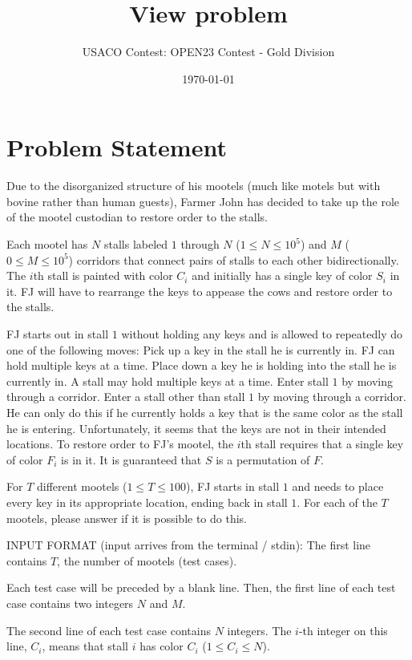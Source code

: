 \documentclass[12pt]{article}
\title{View problem}
\author{USACO Contest: OPEN23 Contest - Gold Division}
\date{\today}
\begin{document}
\maketitle

\section*{Problem Statement}


Due to the disorganized structure of his mootels (much like motels but with
bovine rather than human guests), Farmer John has decided to take up the role of
the mootel custodian to restore order to the stalls.

Each mootel has $N$ stalls labeled $1$ through $N$ ($1 \le N \le 10^5$) and $M$
($0 \le M \le 10^5$) corridors that connect pairs of stalls to each other
bidirectionally. The $i$th stall is painted with color $C_i$ and initially has a
single key of color $S_i$ in it. FJ will have to rearrange the keys to appease
the cows and restore order to the stalls.

FJ starts out in stall $1$ without holding any keys and is allowed to repeatedly
do one of the following moves:
 Pick up a key in the stall he is currently in. FJ can hold multiple keys at
a time. Place down a key he is holding into the stall he is currently
in. A stall may hold multiple keys at a time. Enter stall $1$ by
moving through a corridor. Enter a stall other than stall $1$ by
moving through a corridor. He can only do this if he currently holds a key that
is the same color as the stall he is entering.
Unfortunately, it seems that the keys are not in their intended locations. To
restore order to FJ's mootel, the $i$th stall requires that a single key of
color $F_i$ is in it. It is guaranteed that $S$ is a permutation of $F$.

For $T$ different mootels ($1 \le T \le 100$), FJ starts in stall $1$ and needs
to place every key in its appropriate location, ending back in stall $1$. For
each of the $T$ mootels, please answer if it is possible to do this.

INPUT FORMAT (input arrives from the terminal / stdin):
The first line contains $T$, the number of mootels (test cases).

Each test case will be preceded by a blank line. Then, the first line 
of each test case contains two integers $N$ and $M$.

The second line of each test case contains $N$ integers. The $i$-th integer on
this line, $C_i$, means that stall $i$ has color $C_i$ ($1 \le C_i \le N$).
\end{document}
